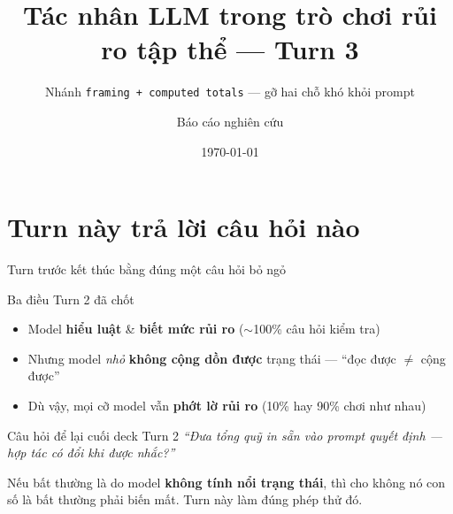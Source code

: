 \documentclass[aspectratio=169,10pt]{beamer}
\title{Tác nhân LLM trong trò chơi rủi ro tập thể --- Turn 3}
\subtitle{Nhánh \texttt{framing + computed totals} --- gỡ hai chỗ khó khỏi prompt}
\date{\today}
\author{Báo cáo nghiên cứu}
\newcommand{\good}[1]{\textcolor{green!45!black}{\textbf{#1}}}
\newcommand{\weak}[1]{\textcolor{red!70!black}{\textbf{#1}}}
\begin{document}
\maketitle

\section{Turn này trả lời câu hỏi nào}

\begin{frame}{Turn trước kết thúc bằng đúng một câu hỏi bỏ ngỏ}
  \begin{block}{Ba điều Turn 2 đã chốt}
    \begin{itemize}\setlength\itemsep{3pt}
      \item Model \good{hiểu luật} \& \good{biết mức rủi ro} ($\sim$100\% câu hỏi kiểm tra)
      \item Nhưng model \emph{nhỏ} \weak{không cộng dồn được} trạng thái --- ``đọc được $\neq$ cộng được''
      \item Dù vậy, mọi cỡ model vẫn \weak{phớt lờ rủi ro} (10\% hay 90\% chơi như nhau)
    \end{itemize}
  \end{block}
  \begin{exampleblock}{Câu hỏi để lại cuối deck Turn 2}
    \emph{``Đưa tổng quỹ in sẵn vào prompt quyết định --- hợp tác có đổi khi được nhắc?''}
    \smallskip

    Nếu bất thường là do model \textbf{không tính nổi trạng thái}, thì \alert{cho không nó con số}
    là bất thường phải biến mất. Turn này làm đúng phép thử đó.
  \end{exampleblock}
\end{frame}
\end{document}

